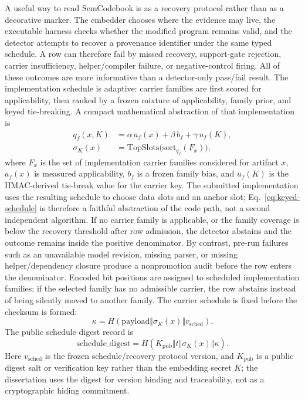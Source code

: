 A useful way to read SemCodebook is as a recovery protocol rather than as a decorative marker. The embedder chooses where the evidence may live, the executable harness checks whether the modified program remains valid, and the detector attempts to recover a provenance identifier under the same typed schedule. A row can therefore fail by missed recovery, support-gate rejection, carrier insufficiency, helper/compiler failure, or negative-control firing. All of these outcomes are more informative than a detector-only pass/fail result. The implementation schedule is adaptive: carrier families are first scored for applicability, then ranked by a frozen mixture of applicability, family prior, and keyed tie-breaking. A compact mathematical abstraction of that implementation is
\begin{align}
  q_f(x,K) &= \alpha\,a_f(x)+\beta\,b_f+\gamma\,u_f(K),\\
  \sigma_K(x) &= \mathrm{TopSlots}\bigl(\mathrm{sort}_{q_f}(F_x)\bigr),
  \label{eq:keyed-schedule}
\end{align}
where $F_x$ is the set of implementation carrier families considered for artifact $x$, $a_f(x)$ is measured applicability, $b_f$ is a frozen family bias, and $u_f(K)$ is the HMAC-derived tie-break value for the carrier key. The submitted implementation uses the resulting schedule to choose data slots and an anchor slot; Eq.~\eqref{eq:keyed-schedule} is therefore a faithful abstraction of the code path, not a second independent algorithm.
If no carrier family is applicable, or the family coverage is below the recovery threshold after row admission, the detector abstains and the outcome remains inside the positive denominator. By contrast, pre-run failures such as an unavailable model revision, missing parser, or missing helper/dependency closure produce a nonpromotion audit before the row enters the denominator. Encoded bit positions are assigned to scheduled implementation families; if the selected family has no admissible carrier, the row abstains instead of being silently moved to another family.
The carrier schedule is fixed before the checksum is formed:
\begin{equation}
  \kappa = H(\mathrm{payload}\Vert \sigma_K(x)\Vert v_{\mathrm{sched}}).
\end{equation}
The public schedule digest record is
\begin{equation}
  \mathrm{schedule\_digest}=H(K_{\mathrm{pub}}\Vert t\Vert \sigma_K(x)\Vert \kappa).
\end{equation}
Here $v_{\mathrm{sched}}$ is the frozen schedule/recovery protocol version, and $K_{\mathrm{pub}}$ is a public digest salt or verification key rather than the embedding secret $K$; the dissertation uses the digest for version binding and traceability, not as a cryptographic hiding commitment.
